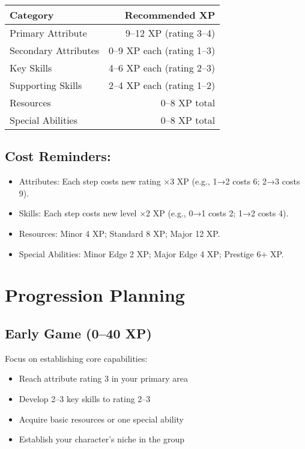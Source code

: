 \documentclass[11pt,twoside,openany]{book}
\begin{document}
\begin{center}
\begin{tabular}{|l|r|}
\hline
\textbf{Category} & \textbf{Recommended XP} \\
\hline
Primary Attribute & 9–12 XP (rating 3–4) \\
Secondary Attributes & 0–9 XP each (rating 1–3) \\
Key Skills & 4–6 XP each (rating 2–3) \\
Supporting Skills & 2–4 XP each (rating 1–2) \\
Resources & 0–8 XP total \\
Special Abilities & 0–8 XP total \\
\hline
\end{tabular}
\end{center}

\subsection*{Cost Reminders:}

\begin{itemize}
\item Attributes: Each step costs new rating ×3 XP (e.g., 1→2 costs 6; 2→3 costs 9).
\item Skills: Each step costs new level ×2 XP (e.g., 0→1 costs 2; 1→2 costs 4).
\item Resources: Minor 4 XP; Standard 8 XP; Major 12 XP.
\item Special Abilities: Minor Edge 2 XP; Major Edge 4 XP; Prestige 6+ XP.
\end{itemize}

\section*{Progression Planning} 

\subsection*{Early Game (0–40 XP)}

Focus on establishing core capabilities:
\begin{itemize}
\item Reach attribute rating 3 in your primary area
\item Develop 2–3 key skills to rating 2–3
\item Acquire basic resources or one special ability
\item Establish your character's niche in the group
\end{itemize}
\end{document}

